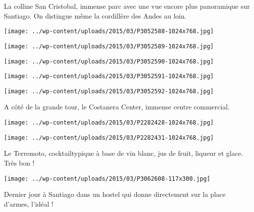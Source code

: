 La colline San Cristobal, immense parc avec une vue encore plus panoramique sur Santiago. On distingue même la cordillère des Andes au loin. 

\begin{center} \texttt{[image: ../wp-content/uploads/2015/03/P3052588-1024x768.jpg]} \end{center}

 

\begin{center} \texttt{[image: ../wp-content/uploads/2015/03/P3052589-1024x768.jpg]} \end{center}

 

\begin{center} \texttt{[image: ../wp-content/uploads/2015/03/P3052590-1024x768.jpg]} \end{center}

 

\begin{center} \texttt{[image: ../wp-content/uploads/2015/03/P3052591-1024x768.jpg]} \end{center}

 

\begin{center} \texttt{[image: ../wp-content/uploads/2015/03/P3052592-1024x768.jpg]} \end{center}

A côté de la grande tour, le Costanera Center, immense centre commercial. 

\begin{center} \texttt{[image: ../wp-content/uploads/2015/03/P2282428-1024x768.jpg]} \end{center}

 

\begin{center} \texttt{[image: ../wp-content/uploads/2015/03/P2282431-1024x768.jpg]} \end{center}

 Le Terremoto, cocktailtypique à base de vin blanc, jus de fruit, liqueur et glace. Très bon ! 

\begin{center} \texttt{[image: ../wp-content/uploads/2015/03/P3062608-117x300.jpg]} \end{center}

 Dernier jour à Santiago dans un hostel qui donne directement sur la place d'armes, l'idéal ! 

